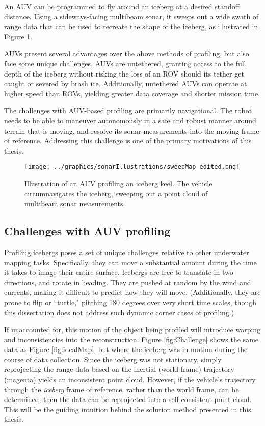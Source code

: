 An AUV can be programmed to fly around an iceberg at a desired standoff distance. Using a sideways-facing multibeam sonar, it sweeps out a wide swath of range data that can be used to recreate the shape of the iceberg, as illustrated in Figure \ref{fig:introSetup}. 

AUVs present several advantages over the above methods of profiling, but also face some unique challenges. AUVs are untethered, granting access to the full depth of the iceberg without risking the loss of an ROV should its tether get caught or severed by brash ice. Additionally, untethered AUVs can operate at higher speed than ROVs, yielding greater data coverage and shorter mission  time. 

The challenges with AUV-based profiling are primarily navigational. The robot needs to be able to maneuver autonomously in a safe and robust manner around terrain that is moving, and resolve its sonar measurements into the moving frame of reference. Addressing this challenge is one of the primary motivations of this thesis.

\begin{figure}[!htb]
   \centering
   \texttt{[image: ../graphics/sonarIllustrations/sweepMap\_edited.png]} %
   \caption{Illustration of an AUV profiling an iceberg keel. The vehicle circumnavigates the iceberg, sweeping out a point cloud of multibeam sonar measurements. }
   \label{fig:introSetup}
\end{figure}


\subsection{Challenges with AUV profiling}

Profiling icebergs poses a set of unique challenges relative to other underwater mapping tasks. Specifically, they can move a substantial amount during the time it takes to image their entire surface. Icebergs are free to translate in two directions, and rotate in heading. They are pushed at random by the wind  and currents, making it difficult to predict how they will move. (Additionally, they are prone to flip or ``turtle," pitching 180 degrees over very short time scales, though this dissertation does not address such dynamic corner cases of profiling.) 

If unaccounted for, this motion of the object being profiled will introduce warping and inconsistencies into the reconstruction. Figure \ref{fig:Challenge} shows the same data as Figure \ref{fig:idealMap}, but where the iceberg was in motion during the course of data collection. Since the iceberg was not stationary, simply reprojecting the range data based on the inertial (world-frame) trajectory (magenta) yields an inconsistent point cloud. However, if the vehicle's trajectory through the \emph{iceberg} frame of reference, rather than the world frame, can be determined, then the data can be reprojected into a self-consistent point cloud. This will be the guiding intuition behind the solution method presented in this thesis.

